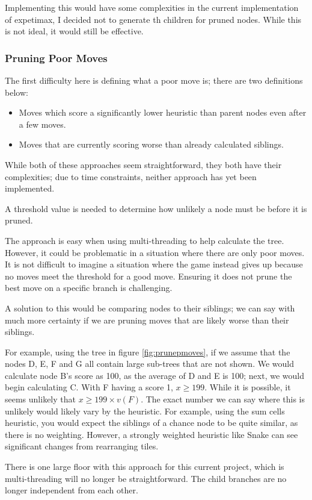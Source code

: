 \documentclass{article}
\begin{document}
Implementing this would have some complexities in the current implementation of expetimax, I decided not to generate th children for pruned nodes. While this is not ideal, it would still be effective.
   \subsubsection{Pruning Poor Moves}
The first difficulty here is defining what a poor move is; there are two definitions below:
\begin{itemize}
    \item Moves which score a significantly lower heuristic than parent nodes even after a few moves.
    \item Moves that are currently scoring worse than already calculated siblings.
\end{itemize}

While both of these approaches seem straightforward, they both have their complexities; due to time constraints, neither approach has yet been implemented.

A threshold value is needed to determine how unlikely a node must be before it is pruned.

The approach is easy when using multi-threading to help calculate the tree. However, it could be problematic in a situation where there are only poor moves. It is not difficult to imagine a situation where the game instead gives up because no moves meet the threshold for a good move. Ensuring it does not prune the best move on a specific branch is challenging.

A solution to this would be comparing nodes to their siblings; we can say with much more certainty if we are pruning moves that are likely worse than their siblings.

For example, using the tree in figure \ref{fig:prunepmoves}, if we assume that the nodes D, E, F and G all contain large sub-trees that are not shown. We would calculate node B's score as 100, as the average of D and E is 100; next, we would begin calculating C. With F having a score 1, $x \ge 199$. While it is possible, it seems unlikely that $x \ge 199 \times v(F)$. The exact number we can say where this is unlikely would likely vary by the heuristic. For example, using the sum cells heuristic, you would expect the siblings of a chance node to be quite similar, as there is no weighting. However, a strongly weighted heuristic like Snake can see significant changes from rearranging tiles.

There is one large floor with this approach for this current project, which is multi-threading will no longer be straightforward. The child branches are no longer independent from each other.
\end{document}
